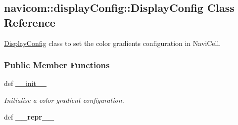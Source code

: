 \hypertarget{classnavicom_1_1displayConfig_1_1DisplayConfig}{
\subsection{navicom::displayConfig::DisplayConfig Class Reference}
\label{classnavicom_1_1displayConfig_1_1DisplayConfig}
}


\hyperlink{classnavicom_1_1displayConfig_1_1DisplayConfig}{DisplayConfig} class to set the color gradients configuration in NaviCell.  


\subsubsection*{Public Member Functions}
\begin{DoxyCompactItemize}
\item 
def \hyperlink{classnavicom_1_1displayConfig_1_1DisplayConfig_a26387ee9e6fe63612bc87a4d5d4a17f2}{\_\-\_\-init\_\-\_\-}
\begin{DoxyCompactList}\small\item\em Initialise a color gradient configuration. \item\end{DoxyCompactList}\item 
\hypertarget{classnavicom_1_1displayConfig_1_1DisplayConfig_ab37d4762509f9ca98fdc74ec06702f36}{
def {\bfseries \_\-\_\-repr\_\-\_\-}}
\label{classnavicom_1_1displayConfig_1_1DisplayConfig_ab37d4762509f9ca98fdc74ec06702f36}

\end{DoxyCompactItemize}
